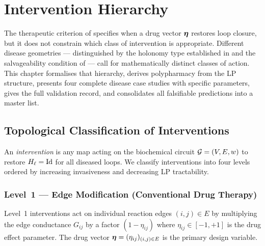 ﻿%

\chapter{Intervention Hierarchy}
\label{ch:intervention}

The therapeutic criterion of  specifies when a drug vector
$\boldsymbol{\eta}$ restores loop closure, but it does not constrain which class of
intervention is appropriate.  Different disease geometries — distinguished by
the holonomy type established in  and the salvageability
condition of  — call for mathematically distinct
classes of action.  This chapter formalises that hierarchy, derives polypharmacy
from the LP structure, presents four complete disease case studies with specific
parameters, gives the full validation record, and consolidates all falsifiable
predictions into a master list.

\section{Topological Classification of Interventions}
\label{sec:intervention-classes}

\begin{definition}
\label{def:intervention-level}
An \emph{intervention} is any map acting on the biochemical circuit
$\mathcal{G} = (V, E, w)$ to restore $H_\ell = \mathrm{Id}$ for all diseased loops.
We classify interventions into four levels ordered by increasing invasiveness
and decreasing LP tractability.
\end{definition}

\subsection{Level~1 — Edge Modification (Conventional Drug Therapy)}
\label{sec:level1}

Level~1 interventions act on individual reaction edges $(i,j) \in E$ by
multiplying the edge conductance $G_{ij}$ by a factor $(1 - \eta_{ij})$ where
$\eta_{ij} \in [-1, +1]$ is the drug effect parameter.  The drug vector
$\boldsymbol{\eta} = (\eta_{ij})_{(i,j) \in E}$ is the primary design variable.

